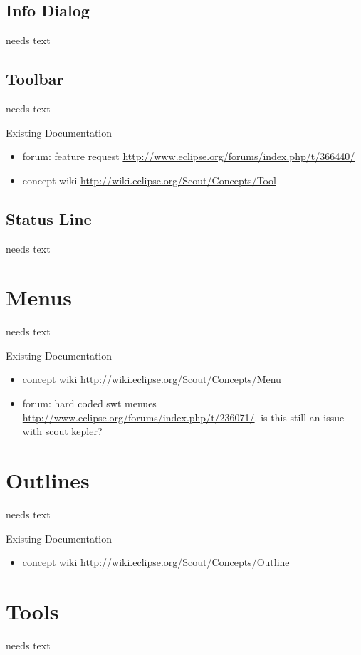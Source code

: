 \documentclass[a4paper,10pt,twoside]{book}
\begin{document}
\subsection{Info Dialog}
needs text

\subsection{Toolbar}
needs text

\noindent Existing Documentation
\begin{itemize}
  \item forum: feature request \url{http://www.eclipse.org/forums/index.php/t/366440/}
  \item concept wiki \url{http://wiki.eclipse.org/Scout/Concepts/Tool}
\end{itemize}

\subsection{Status Line}
needs text

\section{Menus}
needs text

\noindent Existing Documentation
\begin{itemize}
  \item concept wiki \url{http://wiki.eclipse.org/Scout/Concepts/Menu}
  \item forum: hard coded swt menues \url{http://www.eclipse.org/forums/index.php/t/236071/}. is this still an issue with scout kepler?
\end{itemize}

\section{Outlines}
needs text

\noindent Existing Documentation
\begin{itemize}
  \item concept wiki \url{http://wiki.eclipse.org/Scout/Concepts/Outline}
\end{itemize}

\section{Tools}
needs text
\end{document}
